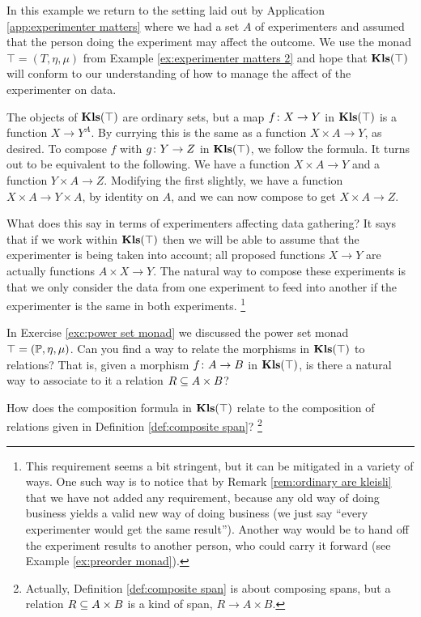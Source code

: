 \documentclass[CT4S-EN-RU]{subfiles}
\begin{document}
\begin{example}\label{ex:experimenter matters 3}

In this example we return to the setting laid out by Application \ref{app:experimenter matters} where we had a set $A$ of experimenters and assumed that the person doing the experiment may affect the outcome. We use the monad $\top=(T,\eta,\mu)$ from Example \ref{ex:experimenter matters 2} and hope that $\Kls(\top)$ will conform to our understanding of how to manage the affect of the experimenter on data.

The objects of $\Kls(\top)$ are ordinary sets, but a map $f\taking X\to Y$ in $\Kls(\top)$ is a function $X\to Y^A$. By currying this is the same as a function $X\times A\to Y$, as desired. To compose $f$ with $g\taking Y\to Z$ in $\Kls(\top)$, we follow the formula. It turns out to be equivalent to the following. We have a function $X\times A\to Y$ and a function $Y\times A\to Z$. Modifying the first slightly, we have a function $X\times A\to Y\times A$, by identity on $A$, and we can now compose to get $X\times A\to Z$.

What does this say in terms of experimenters affecting data gathering? It says that if we work within $\Kls(\top)$ then we will be able to assume that the experimenter is being taken into account; all proposed functions $X\to Y$ are actually functions $A\times X\to Y$. The natural way to compose these experiments is that we only consider the data from one experiment to feed into another if the experimenter is the same in both experiments.
\footnote{This requirement seems a bit stringent, but it can be mitigated in a variety of ways. One such way is to notice that by Remark \ref{rem:ordinary are kleisli} that we have not added any requirement, because any old way of doing business yields a valid new way of doing business (we just say “every experimenter would get the same result”). Another way would be to hand off the experiment results to another person, who could carry it forward (see Example \ref{ex:preorder monad}).}

\end{example}

\begin{exercise}\label{exc:kleisli powerset relations}
In Exercise \ref{exc:power set monad} we discussed the power set monad $\top=(\PP,\eta,\mu)$.
\sexc Can you find a way to relate the morphisms in $\Kls(\top)$ to relations? That is, given a morphism $f\taking A\to B$ in $\Kls(\top)$, is there a natural way to associate to it a relation $R\ss A\times B$?
\item How does the composition formula in $\Kls(\top)$ relate to the composition of relations given in Definition \ref{def:composite span}?
\footnote{Actually, Definition \ref{def:composite span} is about composing spans, but a relation $R\ss A\times B$ is a kind of span, $R\to A\times B$.}
\endsexc
\end{exercise}
\end{document}
